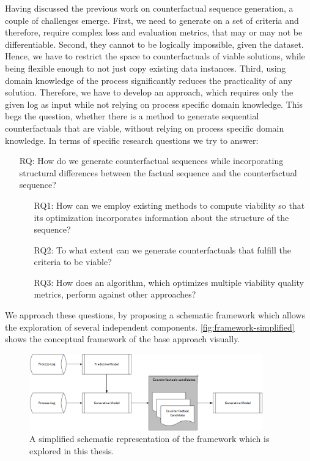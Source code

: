 \documentclass[./../../paper.tex]{subfiles}
\begin{document}
Having discussed the previous work on counterfactual sequence generation, a couple of challenges emerge.
First, we need to generate on a set of criteria and therefore, require complex loss and evaluation metrics, that may or may not be differentiable. Second, they cannot to be logically impossible, given the dataset.
Hence, we have to restrict the space to counterfactuals of viable solutions, while being flexible enough to not just copy existing data instances.
Third, using domain knowledge of the process significantly reduces the practicality of any solution. Therefore, we have to develop an approach, which requires only the given log as input while not relying on process specific domain knowledge. This begs the question, whether there is a method to generate sequential counterfactuals that are viable, without relying on process specific domain knowledge. In terms of specific research questions we try to answer:

\begin{itemize}
    \item[RQ:] How do we generate counterfactual sequences while incorporating structural differences between the factual sequence and the counterfactual sequence?
          \begin{itemize}
            \item[RQ1:] How can we employ existing methods to compute viability so that its optimization incorporates information about the structure of the sequence?
              \item[RQ2:] To what extent can we generate counterfactuals that fulfill the criteria to be viable?
              \item[RQ3:] How does an algorithm, which optimizes multiple viability quality metrics, perform against other approaches?
          \end{itemize}
\end{itemize}

\noindent We approach these questions, by proposing a schematic framework which allows the exploration of several independent components. \autoref{fig:framework-simplified} shows the conceptual framework of the base approach visually.

\begin{figure}[htb]
    \centering
    \includegraphics[width=0.9\textwidth]{figures/framework_simplified.png}
    \caption{A simplified schematic representation of the framework which is explored in this thesis.}
    \label{fig:framework-simplified}
\end{figure}
\end{document}
